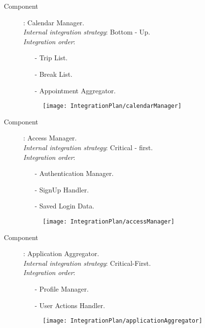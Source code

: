 \begin{description}
	
	
	\vskip1.5cm
	\item[Component]: Calendar Manager.\\
		\textit{Internal integration strategy}: Bottom - Up.\\
		\textit{Integration order}:
		\begin{itemize}
			\item[-] Trip List.
			\item[-] Break List.
			\item[-] Appointment Aggregator.
		\end{itemize}
		
		\begin{figure}[H]
			\centering
			\texttt{[image: IntegrationPlan/calendarManager]}
		\end{figure}


	\vskip1.5cm
	\item[Component]: Access Manager.\\
		\textit{Internal integration strategy}: Critical - first.\\
		\textit{Integration order}:
		\begin{itemize}
			\item[-] Authentication Manager.
			\item[-] SignUp Handler.
			\item[-] Saved Login Data.
		\end{itemize}
		
		\begin{figure}[H]
			\centering
			\texttt{[image: IntegrationPlan/accessManager]}
		\end{figure}
		
		
	\vskip1.5cm
	\item[Component]: Application Aggregator.\\
		\textit{Internal integration strategy}: Critical-First.\\
		\textit{Integration order}:
		\begin{itemize}
			\item[-] Profile Manager.
			\item[-] User Actions Handler.
		\end{itemize}
		
		\begin{figure}[H]
			\centering
			\texttt{[image: IntegrationPlan/applicationAggregator]}
		\end{figure}
		
\end{description}